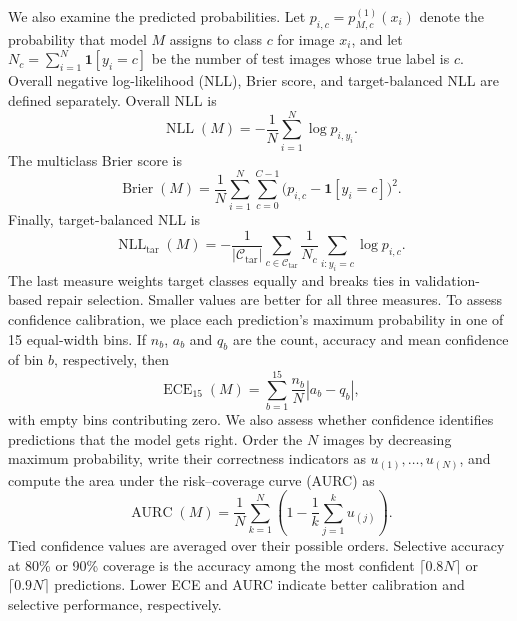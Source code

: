 \documentclass[review,number,sort&compress]{elsarticle}
\theoremstyle{definition}
\begin{document}
We also examine the predicted probabilities. Let
$p_{i,c}=p_{M,c}^{(1)}(x_i)$ denote the probability that model $M$
assigns to class $c$ for image $x_i$, and let
$N_c=\sum_{i=1}^{N}\mathbf{1}[y_i=c]$ be the number of test images
whose true label is $c$. Overall negative log-likelihood (NLL), Brier
score, and target-balanced NLL are defined separately. Overall NLL is
\begin{equation}
\label{eq:overall-nll}
\operatorname{NLL}(M)
=-\frac{1}{N}\sum_{i=1}^{N}\log p_{i,y_i}.
\end{equation}
The multiclass Brier score is
\begin{equation}
\label{eq:brier-score}
\operatorname{Brier}(M)
=\frac{1}{N}\sum_{i=1}^{N}\sum_{c=0}^{C-1}
\bigl(p_{i,c}-\mathbf{1}[y_i=c]\bigr)^2.
\end{equation}
Finally, target-balanced NLL is
\begin{equation}
\label{eq:target-balanced-nll}
\operatorname{NLL}_{\mathrm{tar}}(M)
=-\frac{1}{|\mathcal C_{\mathrm{tar}}|}
\sum_{c\in\mathcal C_{\mathrm{tar}}}
\frac{1}{N_c}\sum_{i:y_i=c}\log p_{i,c}.
\end{equation}
The last measure weights target classes equally and breaks ties in
validation-based repair selection. Smaller values are better for all
three measures. To assess confidence calibration, we place each
prediction's maximum probability in one of 15 equal-width bins. If
$n_b$, $a_b$ and $q_b$ are the count, accuracy and mean confidence of
bin $b$, respectively, then
\begin{equation}
\label{eq:ece-metric}
\operatorname{ECE}_{15}(M)=\sum_{b=1}^{15}
\frac{n_b}{N}|a_b-q_b|,
\end{equation}
with empty bins contributing zero. We also assess whether confidence
identifies predictions that the model gets right. Order the $N$
images by decreasing maximum probability, write their correctness
indicators as $u_{(1)},\ldots,u_{(N)}$, and compute the area under the
risk--coverage curve (AURC) as
\begin{equation}
\label{eq:aurc-metric}
\operatorname{AURC}(M)=\frac{1}{N}\sum_{k=1}^{N}
\left(1-\frac{1}{k}\sum_{j=1}^{k}u_{(j)}\right).
\end{equation}
Tied confidence values are averaged over their possible orders.
Selective accuracy at 80\% or 90\% coverage is the accuracy among the
most confident $\lceil 0.8N\rceil$ or $\lceil 0.9N\rceil$ predictions.
Lower ECE and AURC indicate better calibration and selective
performance, respectively.
\end{document}
